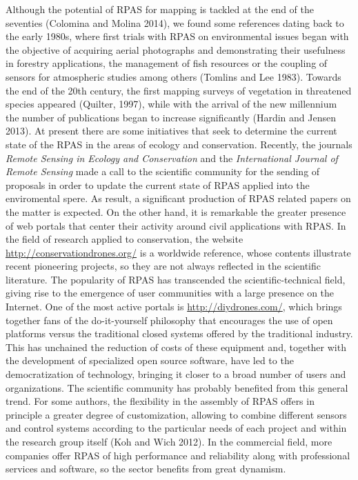 \documentclass[]{interact}
\theoremstyle{plain}%
\theoremstyle{definition}
\theoremstyle{remark}
\begin{document}
Although the potential of RPAS for mapping is tackled at the end of the
seventies (Colomina and Molina 2014), we found some references dating
back to the early 1980s, where first trials with RPAS on environmental
issues began with the objective of acquiring aerial photographs and
demonstrating their usefulness in forestry applications, the management
of fish resources or the coupling of sensors for atmospheric studies
among others (Tomlins and Lee 1983). Towards the end of the 20th
century, the first mapping surveys of vegetation in threatened species
appeared (Quilter, 1997), while with the arrival of the new millennium
the number of publications began to increase significantly (Hardin and
Jensen 2013). At present there are some initiatives that seek to
determine the current state of the RPAS in the areas of ecology and
conservation. Recently, the journals \emph{Remote Sensing in Ecology and
Conservation} and the \emph{International Journal of Remote Sensing}
made a call to the scientific community for the sending of proposals in
order to update the current state of RPAS applied into the enviromental
spere. As result, a significant production of RPAS related papers on the
matter is expected. On the other hand, it is remarkable the greater
presence of web portals that center their activity around civil
applications with RPAS. In the field of research applied to
conservation, the website \url{http://conservationdrones.org/} is a
worldwide reference, whose contents illustrate recent pioneering
projects, so they are not always reflected in the scientific literature.
The popularity of RPAS has transcended the scientific-technical field,
giving rise to the emergence of user communities with a large presence
on the Internet. One of the most active portals is
\url{http://diydrones.com/}, which brings together fans of the
do-it-yourself philosophy that encourages the use of open platforms
versus the traditional closed systems offered by the traditional
industry. This has unchained the reduction of costs of these equipment
and, together with the development of specialized open source software,
have led to the democratization of technology, bringing it closer to a
broad number of users and organizations. The scientific community has
probably benefited from this general trend. For some authors, the
flexibility in the assembly of RPAS offers in principle a greater degree
of customization, allowing to combine different sensors and control
systems according to the particular needs of each project and within the
research group itself (Koh and Wich 2012). In the commercial field, more
companies offer RPAS of high performance and reliability along with
professional services and software, so the sector benefits from great
dynamism.
\end{document}
